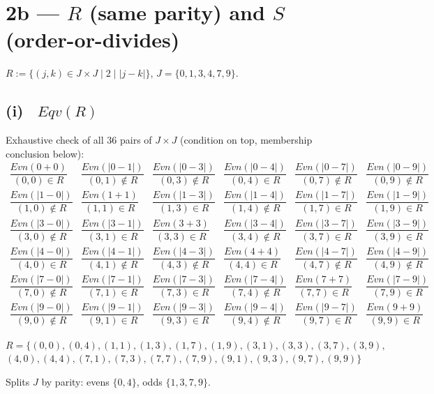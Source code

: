 \documentclass[11pt]{article}
\newcommand{\op}[1]{\mathit{#1}}
\newcommand{\Eqv}{\op{Eqv}} \newcommand{\PO}{\op{PO}} \newcommand{\DG}{\op{DG}}
\newcommand{\circy}{\fbox{Y}} \newcommand{\circn}{\fbox{N}}
\newcommand{\seclabel}[1]{\noindent\fbox{\textbf{#1}}\par\smallskip}
\begin{document}
\clearpage
\section*{2b --- $R$ (same parity) and $S$ (order-or-divides)}
$R:=\{(j,k)\in J\times J\mid 2\mid|j-k|\}$, $J=\{0,1,3,4,7,9\}$.

\subsection*{(i) \circy\ $\Eqv(R)$}
\seclabel{2b.i}
Exhaustive check of all $36$ pairs of $J\times J$ (condition on top, membership conclusion below):
\begingroup\tiny\setlength{\arraycolsep}{2pt}
\[
\begin{array}{cccccc}
\dfrac{Evn(0+0)}{(0,0)\in R} & \dfrac{Evn(|0-1|)}{(0,1)\notin R} & \dfrac{Evn(|0-3|)}{(0,3)\notin R} & \dfrac{Evn(|0-4|)}{(0,4)\in R} & \dfrac{Evn(|0-7|)}{(0,7)\notin R} & \dfrac{Evn(|0-9|)}{(0,9)\notin R} \\[3mm]
\dfrac{Evn(|1-0|)}{(1,0)\notin R} & \dfrac{Evn(1+1)}{(1,1)\in R} & \dfrac{Evn(|1-3|)}{(1,3)\in R} & \dfrac{Evn(|1-4|)}{(1,4)\notin R} & \dfrac{Evn(|1-7|)}{(1,7)\in R} & \dfrac{Evn(|1-9|)}{(1,9)\in R} \\[3mm]
\dfrac{Evn(|3-0|)}{(3,0)\notin R} & \dfrac{Evn(|3-1|)}{(3,1)\in R} & \dfrac{Evn(3+3)}{(3,3)\in R} & \dfrac{Evn(|3-4|)}{(3,4)\notin R} & \dfrac{Evn(|3-7|)}{(3,7)\in R} & \dfrac{Evn(|3-9|)}{(3,9)\in R} \\[3mm]
\dfrac{Evn(|4-0|)}{(4,0)\in R} & \dfrac{Evn(|4-1|)}{(4,1)\notin R} & \dfrac{Evn(|4-3|)}{(4,3)\notin R} & \dfrac{Evn(4+4)}{(4,4)\in R} & \dfrac{Evn(|4-7|)}{(4,7)\notin R} & \dfrac{Evn(|4-9|)}{(4,9)\notin R} \\[3mm]
\dfrac{Evn(|7-0|)}{(7,0)\notin R} & \dfrac{Evn(|7-1|)}{(7,1)\in R} & \dfrac{Evn(|7-3|)}{(7,3)\in R} & \dfrac{Evn(|7-4|)}{(7,4)\notin R} & \dfrac{Evn(7+7)}{(7,7)\in R} & \dfrac{Evn(|7-9|)}{(7,9)\in R} \\[3mm]
\dfrac{Evn(|9-0|)}{(9,0)\notin R} & \dfrac{Evn(|9-1|)}{(9,1)\in R} & \dfrac{Evn(|9-3|)}{(9,3)\in R} & \dfrac{Evn(|9-4|)}{(9,4)\notin R} & \dfrac{Evn(|9-7|)}{(9,7)\in R} & \dfrac{Evn(9+9)}{(9,9)\in R}
\end{array}
\]
\endgroup
\begin{center}\small
$R = \{(0,0),(0,4),(1,1),(1,3),(1,7),(1,9),(3,1),(3,3),(3,7),(3,9),$\\
$(4,0),(4,4),(7,1),(7,3),(7,7),(7,9),(9,1),(9,3),(9,7),(9,9)\}$
\end{center}
Splits $J$ by parity: evens $\{0,4\}$, odds $\{1,3,7,9\}$.
\end{document}
